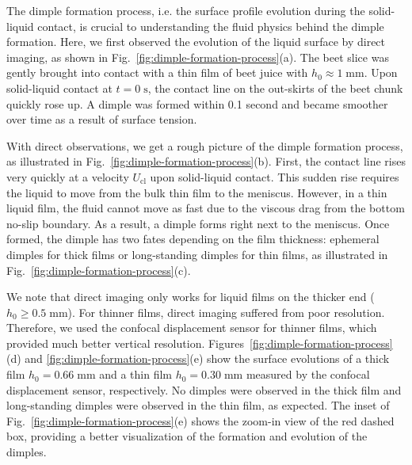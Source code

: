 \documentclass[aps,prfluids,amsmath,amssymb,superscriptaddress,longbibliography]{revtex4-2}
\begin{document}
The dimple formation process, i.e. the surface profile evolution during the solid-liquid contact, is crucial to understanding the fluid physics behind the dimple formation. 
Here, we first observed the evolution of the liquid surface by direct imaging, as shown in Fig.~\ref{fig:dimple-formation-process}(a).
The beet slice was gently brought into contact with a thin film of beet juice with $h_0\approx 1\;\mathrm{mm}$. 
Upon solid-liquid contact at $t=0\;\mathrm{s}$, the contact line on the out-skirts of the beet chunk quickly rose up.
A dimple was formed within 0.1 second and became smoother over time as a result of surface tension.

With direct observations, we get a rough picture of the dimple formation process, as illustrated in Fig.~\ref{fig:dimple-formation-process}(b).
First, the contact line rises very quickly at a velocity $U_{\mathrm{cl}}$ upon solid-liquid contact.
This sudden rise requires the liquid to move from the bulk thin film to the meniscus.
However, in a thin liquid film, the fluid cannot move as fast due to the viscous drag from the bottom no-slip boundary.
As a result, a dimple forms right next to the meniscus.
Once formed, the dimple has two fates depending on the film thickness: ephemeral dimples for thick films or long-standing dimples for thin films, as illustrated in Fig.~\ref{fig:dimple-formation-process}(c).

We note that direct imaging only works for liquid films on the thicker end ($h_0\ge 0.5\;\mathrm{mm}$).
For thinner films, direct imaging suffered from poor resolution.
Therefore, we used the confocal displacement sensor for thinner films, which provided much better vertical resolution.
Figures~\ref{fig:dimple-formation-process}(d) and \ref{fig:dimple-formation-process}(e) show the surface evolutions of a thick film $h_0=0.66\;\mathrm{mm}$ and a thin film $h_0=0.30\;\mathrm{mm}$ measured by the confocal displacement sensor, respectively.
No dimples were observed in the thick film and long-standing dimples were observed in the thin film, as expected.
The inset of Fig.~\ref{fig:dimple-formation-process}(e) shows the zoom-in view of the red dashed box, providing a better visualization of the formation and evolution of the dimples.
\end{document}

